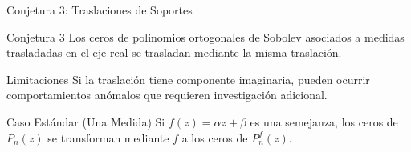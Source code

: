 \begin{frame}{Conjetura 3: Traslaciones de Soportes}
	\begin{block}{Conjetura 3} \small
		Los ceros de polinomios ortogonales de Sobolev asociados a medidas trasladadas en el eje real se trasladan mediante la misma traslación.
	\end{block}
	\pause
	\begin{alertblock}{Limitaciones} \small
		Si la traslación tiene componente imaginaria, pueden ocurrir comportamientos anómalos que requieren investigación adicional.
	\end{alertblock}
	\pause
	\begin{block}{Caso Estándar (Una Medida)}
		Si $f(z) = \alpha z + \beta$ es una semejanza, los ceros de $P_n(z)$ se transforman mediante $f$ a los ceros de $P_n^f(z)$.
	\end{block}
\end{frame}